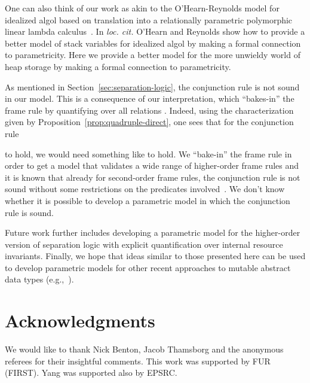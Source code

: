 \documentclass{LMCS}
\begin{document}
One can also think of our work as akin to the O'Hearn-Reynolds model for
idealized algol based on translation into a relationally parametric
polymorphic linear lambda calculus~\cite{ohearn-reynolds}.  In \emph{loc.
  cit.} O'Hearn and Reynolds show how to provide a better model of stack
variables for idealized algol by making a formal connection to
parametricity. Here we provide a better model for the more unwieldy world
of heap storage by making a formal connection to parametricity.

As mentioned in Section~\ref{sec:separation-logic}, 
the conjunction rule is not sound in our model. This is a consequence of
our interpretation, which ``bakes-in'' the frame rule by quantifying
over all relations . Indeed, using the characterization given by
Proposition~\ref{prop:quadruple-direct}, one sees that for the conjunction
rule 

to hold, we would need something like  to hold. We ``bake-in'' the frame rule in order to get a model
that validates a wide range of higher-order frame rules and it is known
that already for second-order frame rules, the conjunction rule is not
sound without some restrictions on the predicates
involved~\cite{yang-ohearn-reynolds-popl04}. 
We don't know whether it is possible to
develop a parametric model in which the conjunction rule is sound. 

Future work further includes developing a parametric model for 
the higher-order version of separation logic with explicit quantification
over internal resource invariants. 
Finally, we hope that ideas similar to those presented here can be used to
develop parametric models for other recent approaches to mutable abstract
data types (e.g.,~\cite{naumann-barnett}). 

\section*{Acknowledgments}
We would like to thank Nick Benton, Jacob Thamsborg and the anonymous
referees for their insightful comments. This work was supported by FUR
(FIRST). Yang was supported also by EPSRC.
\end{document}
